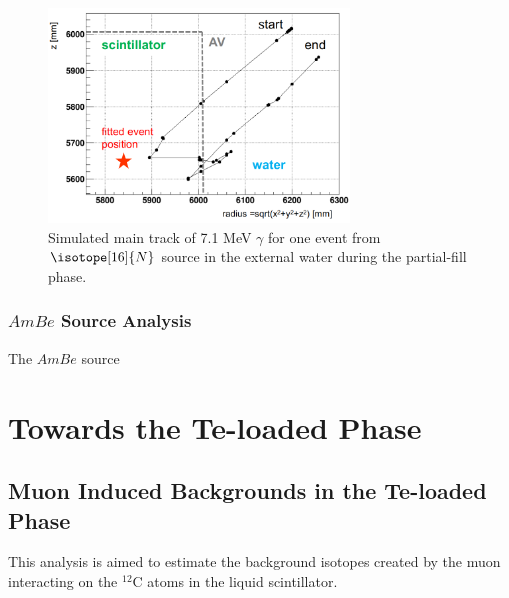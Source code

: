 \begin{figure}[!htb]
	\centering
	\includegraphics[width=8cm]{track_partial_N16.png}
	\caption{Simulated main track of 7.1 MeV $\gamma$ for one event from $\isotope[16]{N}$ source in the external water during the partial-fill phase.}	
	\label{track_partial_N16}
\end{figure}








\subsubsection{$AmBe$ Source Analysis}

The $AmBe$ source










\section{Towards the Te-loaded Phase}

\subsection{Muon Induced Backgrounds in the Te-loaded Phase}
This analysis is aimed to estimate the background isotopes created by the muon interacting on the $^{12}$C atoms in the liquid scintillator.

